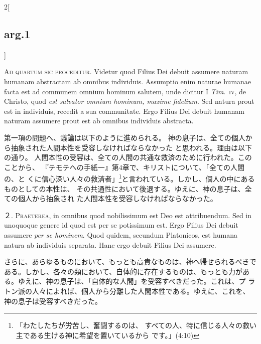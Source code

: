 \documentclass[paper=a4paper,fontsize=10pt,jafontsize=9pt,titlepage]{jlreq}
\begin{document}
\begin{paracol}{2}[\subsection{arg.1}]

{\Huge A}{\scshape d quartum sic proceditur}. Videtur quod Filius Dei debuit assumere
naturam humanam abstractam ab omnibus individuis. Assumptio enim naturae
humanae facta est ad communem omnium hominum salutem, unde dicitur I
{\itshape Tim}.~{\scshape iv}, de Christo, quod {\itshape est salvator omnium hominum, maxime
fidelium}. Sed natura prout est in individuis, recedit a sua
communitate. Ergo Filius Dei debuit humanam naturam assumere prout est
ab omnibus individuis abstracta.

\switchcolumn

第一項の問題へ、議論は以下のように進められる。
神の息子は、全ての個人から抽象された人間本性を受容しなければならなかった
 と思われる。理由は以下の通り。
人間本性の受容は、全ての人間の共通な救済のために行われた。このことから、
 『テモテへの手紙一』第4章で、キリストについて、「全ての人間の、と
 くに信心深い人々の救済者」\footnote{「わたしたちが労苦し、奮闘するのは、
 すべての人、特に信じる人々の救い主である生ける神に希望を置いているから
 です。」(4:10)}と言われている。しかし、個人の中にあるものとしての本性は、
 その共通性において後退する。ゆえに、神の息子は、全ての個人から抽象され
 た人間本性を受容しなければならなかった。


２. {\scshape Praeterea}, in omnibus quod nobilissimum est Deo est attribuendum. Sed in
unoquoque genere id quod est per se potissimum est. Ergo Filius Dei
debuit assumere {\itshape per se hominem}. Quod quidem, secundum Platonicos, est
humana natura ab individuis separata. Hanc ergo debuit Filius Dei
assumere.

\switchcolumn

さらに、あらゆるものにおいて、もっとも高貴なものは、神へ帰せられるべきで
 ある。しかし、各々の類において、自体的に存在するものは、もっとも力があ
 る。ゆえに、神の息子は、「自体的な人間」を受容すべきだった。これは、プ
 ラトン派の人々によれば、個人から分離した人間本性である。ゆえに、これを、
 神の息子は受容すべきだった。



\end{paracol}
\end{document}
